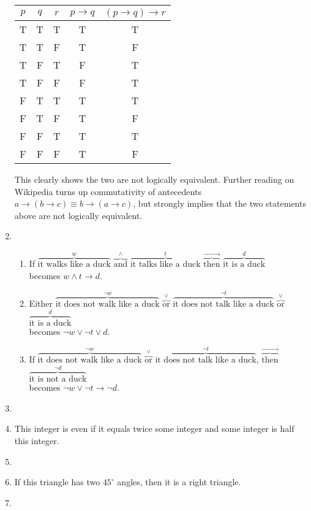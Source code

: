\documentclass[12pt]{article}
\begin{document}
\begin{enumerate}
\begin{tabular} {|c|c|c||c|c|}
\hline
$p$ & $q$ & $r$ & $p \rightarrow q$ & $(p \rightarrow q) \rightarrow r$\\ \hline
T & T & T & T & T\\
T & T & F & T & F\\
T & F & T & F & T\\
T & F & F & F & T\\
F & T & T & T & T\\
F & T & F & T & F\\
F & F & T & T & T\\
F & F & F & T & F\\ \hline
\end{tabular}

This clearly shows the two are not logically equivalent. Further reading on Wikipedia turns up commutativity
of antecedents $a \rightarrow (b \rightarrow c) \equiv b \rightarrow (a \rightarrow c)$, but strongly implies
that the two statements above are not logically equivalent.
\pagebreak{}
\setcounter{enumi}{17} %
\item
  \begin{enumerate}
  \item If $\overbrace{\text{it walks like a duck}}^{w}$ $\overbrace{\text{and}}^{\wedge}$ $\overbrace{\text{it talks like a duck}}^{t}$ $\overbrace{\text{then}}^{\rightarrow}$ $\overbrace{\text{it is a duck}}^{d}$ \\becomes $w \wedge t \rightarrow d$.
  \item Either $\overbrace{\text{it does not walk like a duck}}^{\neg w}$ $\overbrace{\text{or}}^{\vee}$ $\overbrace{\text{it does not talk like a duck}}^{\neg t}$ $\overbrace{\text{or}}^{\vee}$ $\overbrace{\text{it is a duck}}^{d}$ \\becomes $\neg w \vee \neg t \vee d $.
  \item If $\overbrace{\text{it does not walk like a duck}}^{\neg w}$ $\overbrace{\text{or}}^{\vee}$ $\overbrace{\text{it does not talk like a duck}}^{\neg t}$, $\overbrace{\text{then}}^{\rightarrow}$ $\overbrace{\text{it is not a duck}}^{\neg d}$\\becomes $\neg w \vee \neg t \rightarrow \neg d$.
  \end{enumerate}

\setcounter{enumi}{20} %
\item
\setcounter{enumi}{32} %
\item This integer is even if it equals twice some integer and some integer is half this integer.
\setcounter{enumi}{34} %
\item
\setcounter{enumi}{40} %
\item If this triangle has two $45^{\circ}$ angles, then it is a right triangle.
\setcounter{enumi}{42} %
\item 
\end{enumerate}
\end{document}

